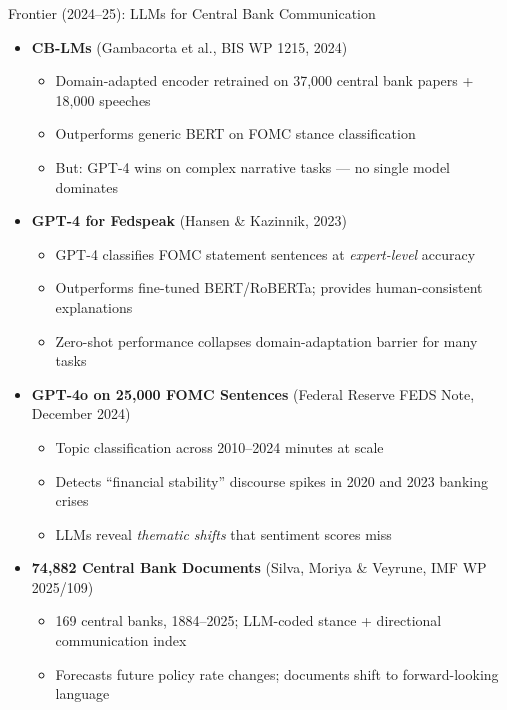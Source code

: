 \begin{frame}{Frontier (2024--25): LLMs for Central Bank Communication}
\begin{itemize}
\item \textbf{CB-LMs} (Gambacorta et al., BIS WP 1215, 2024)
\begin{itemize}
    \item Domain-adapted encoder retrained on 37{,}000 central bank papers + 18{,}000 speeches
    \item Outperforms generic BERT on FOMC stance classification
    \item But: GPT-4 wins on complex narrative tasks --- no single model dominates
\end{itemize}

\medskip
\item \textbf{GPT-4 for Fedspeak} (Hansen \& Kazinnik, 2023)
\begin{itemize}
    \item GPT-4 classifies FOMC statement sentences at \emph{expert-level} accuracy
    \item Outperforms fine-tuned BERT/RoBERTa; provides human-consistent explanations
    \item Zero-shot performance collapses domain-adaptation barrier for many tasks
\end{itemize}

\medskip
\item \textbf{GPT-4o on 25{,}000 FOMC Sentences} (Federal Reserve FEDS Note, December 2024)
\begin{itemize}
    \item Topic classification across 2010--2024 minutes at scale
    \item Detects ``financial stability'' discourse spikes in 2020 and 2023 banking crises
    \item LLMs reveal \emph{thematic shifts} that sentiment scores miss
\end{itemize}

\medskip
\item \textbf{74{,}882 Central Bank Documents} (Silva, Moriya \& Veyrune, IMF WP 2025/109)
\begin{itemize}
    \item 169 central banks, 1884--2025; LLM-coded stance + directional communication index
    \item Forecasts future policy rate changes; documents shift to forward-looking language
\end{itemize}
\end{itemize}
\end{frame}

